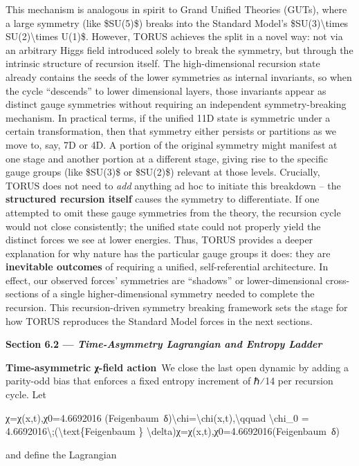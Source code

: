 \documentclass[]{article}
\begin{document}
This mechanism is analogous in spirit to Grand Unified Theories (GUTs),
where a large symmetry (like \$SU(5)\$) breaks into the Standard Model's
\$SU(3)\textbackslash{}times SU(2)\textbackslash{}times U(1)\$. However,
TORUS achieves the split in a novel way: not via an arbitrary Higgs
field introduced solely to break the symmetry, but through the intrinsic
structure of recursion itself​. The high-dimensional recursion state
already contains the seeds of the lower symmetries as internal
invariants, so when the cycle ``descends'' to lower dimensional layers,
those invariants appear as distinct gauge symmetries without requiring
an independent symmetry-breaking mechanism​. In practical terms, if the
unified 11D state is symmetric under a certain transformation, then that
symmetry either persists or partitions as we move to, say, 7D or 4D. A
portion of the original symmetry might manifest at one stage and another
portion at a different stage, giving rise to the specific gauge groups
(like \$SU(3)\$ or \$SU(2)\$) relevant at those levels​. Crucially,
TORUS does not need to \emph{add} anything ad hoc to initiate this
breakdown -- the \textbf{structured recursion itself} causes the
symmetry to differentiate. If one attempted to omit these gauge
symmetries from the theory, the recursion cycle would not close
consistently; the unified state could not properly yield the distinct
forces we see at lower energies​. Thus, TORUS provides a deeper
explanation for why nature has the particular gauge groups it does: they
are \textbf{inevitable outcomes} of requiring a unified,
self-referential architecture. In effect, our observed forces'
symmetries are ``shadows'' or lower-dimensional cross-sections of a
single higher-dimensional symmetry needed to complete the recursion​.
This recursion-driven symmetry breaking framework sets the stage for how
TORUS reproduces the Standard Model forces in the next sections.

\textbf{Section 6.2 --- \emph{Time-Asymmetry Lagrangian and Entropy
Ladder}}

\textbf{Time-asymmetric χ-field action} We close the last open dynamic
by adding a parity-odd bias that enforces a fixed entropy increment of
ℏ⁄14 per recursion cycle. Let

χ=χ(x,t),χ0=4.6692016  (Feigenbaum~δ)\textbackslash{}chi=\textbackslash{}chi(x,t),\textbackslash{}qquad
\textbackslash{}chi\_0 =
4.6692016\textbackslash{};(\textbackslash{}text\{Feigenbaum \}
\textbackslash{}delta)χ=χ(x,t),χ0​=4.6692016(Feigenbaum~δ)

and define the Lagrangian
\end{document}
